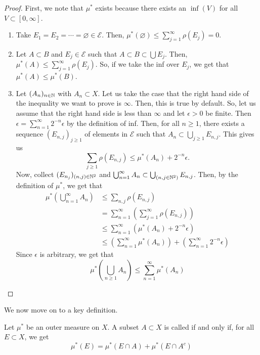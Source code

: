 \documentclass[11pt,leqno,oneside]{amsbook}
\numberwithin{thm}{section}
\newcommand{\Ep}{\mathcal{E}}
\renewcommand{\emptyset}{\varnothing}
\begin{document}
\begin{proof}
  First, we note that $\mu^*$ exists because there exists an $\inf(V)$
  for all $V \subset [0,\infty]$.
  \begin{enumerate}
  \item Take $E_1 = E_2 = \cdots = \emptyset \in \Ep$. Then,
    $\mu^*(\emptyset) \leq \sum_{j=1}^\infty \rho(E_j) = 0$.
  \item Let $A \subset B$ and $E_j \in \Ep$ such that $A \subset B
    \subset \bigcup E_j$. Then, $\mu^*(A) \leq \sum_{j=1}^\infty \rho
    (E_j)$. So, if we take the inf over $E_j$, we get that $\mu^*(A)
    \leq \mu^*(B)$.
  \item Let $(A_n)_{n \in {\mathbb N}}$ with $A_n \subset X$. Let us take the
    case that the right hand side of the inequality we want to prove
    is $\infty$. Then, this is true by default. So, let us assume that
    the right hand side is less than $\infty$ and let $\epsilon > 0$
    be finite. Then $\epsilon = \sum_{n=1}^\infty 2^{-n} \epsilon$ by
    the definition of inf. Then, for all $n \geq 1$, there exists a
    sequence $(E_{n,j})_{j \geq 1}$ of elements in $\Ep$ such that
    $A_n \subset \bigcup_{j \geq 1} E_{n,j}$. This gives us \[
      \sum_{j \geq 1} \rho(E_{n,j}) \leq \mu^*(A_n) + 2^{-n} \epsilon.
    \]
    Now, collect $(E_{n_j})_{(n,j) \in {\mathbb N}^2}$ and
    $\bigcup_{n=1}^\infty A_n \subset \bigcup_{(n,j \in
      {\mathbb N}^2)}E_{n,j}$. Then, by the definition of $\mu^*$, we get that
    \begin{align*}
      \mu^*\left( \bigcup_{n=1}^\infty A_n \right) & \leq \sum_{n,j}
                                                     \rho(E_{n,j}) \\
      & = \sum_{n = 1}^\infty \left( \sum_{j=1}^\infty \rho(E_{n,j})
        \right) \\
      & \leq \sum_{n=1}^\infty \left( \mu^*(A_n) + 2^{-n} \epsilon
        \right) \\
      & \leq \left( \sum_{n=1}^\infty \mu^*(A_n) \right) + \left(
        \sum_{n=1}^\infty 2^{-n} \epsilon \right)
    \end{align*}
    Since $\epsilon$ is arbitrary, we get that \[
      \mu^*\left( \bigcup_{n \geq 1} A_n \right) \leq
      \sum_{n=1}^\infty \mu^*(A_n)
    \]
  \end{enumerate}
\end{proof}
We now move on to a key definition.
\begin{defn}[Carathéodory]
  Let $\mu^*$ be an outer measure on $X$. A subset $A \subset X$ is
  called  if and only if, for all $E \subset
  X$, we get \[
    \mu^*(E) = \mu^*(E \cap A) + \mu^*(E \cap A^c)
  \]
\end{defn}
\end{document}
